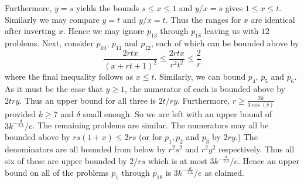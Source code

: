 Furthermore, $y=s$ yields the bounds $s \leq x \leq 1$ and $y/x = s$ gives $1 \leq x \leq t$.
Similarly we may compare $y=t$ and $y/x = t$.
Thus the ranges for $x$ are identical after inverting $x$.
Hence we may ignore $p_{13}$ through $p_{18}$ leaving us with $12$ problems.
%
Next, consider $p_{10}$, $p_{11}$ and $p_{12}$, each of which can be bounded above by
$$
\frac{2rtx}{(x+rt+1)^2} \leq \frac{2rtx}{r^2t^2} \leq \frac{2}{r}
$$
where the final inequality follows as $x \leq t$.
%
Similarly, we can bound $p_4$, $p_5$ and $p_6$.
As it must be the case that $y \geq 1$, the numerator of each is bounded above by $2try$.
Thus an upper bound for all three is $2t/ry$.
Furthermore, $r \geq \frac{2k}{3\cos(\delta)}$ provided $k\geq 7$ and $\delta$ small enough. So we are left with an upper bound of $3 k^{-\frac{d}{2\Delta}}/e$.
%
The remaining problems are similar.
The numerators may all be bounded above by $rs(1+x) \leq 2rs$ (or for $p_1, p_2$ and $p_3$ by $2ry$.)
The denominators are all bounded from below by $r^2s^2$ and $r^2y^2$ respectively.
Thus all six of these are upper bounded by $2/rs$ which is at most $3 k^{-\frac{d}{2\Delta}}/e$.
%
Hence an upper bound on all of the problems $p_1$ through $p_{18}$ is $3 k^{-\frac{d}{2\Delta}}/e$ as claimed.
%
